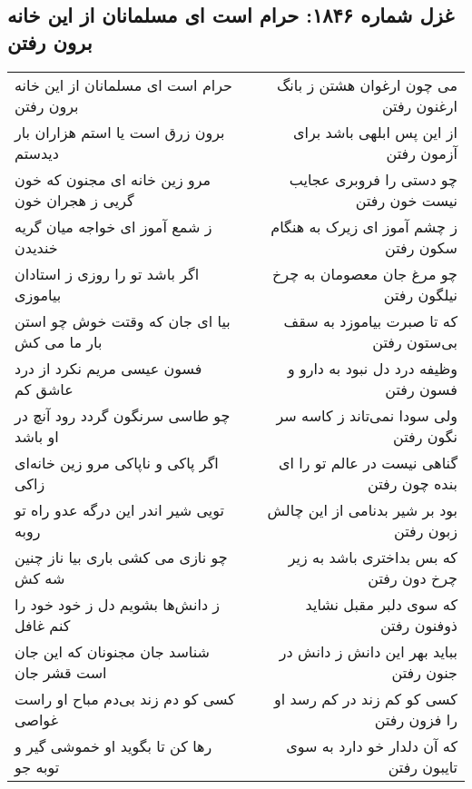 \begin{center}
\section*{غزل شماره ۱۸۴۶: حرام است ای مسلمانان از این خانه برون رفتن}
\label{sec:1846}
\begin{longtable}{l p{0.5cm} r}
حرام است ای مسلمانان از این خانه برون رفتن
&&
می چون ارغوان هشتن ز بانگ ارغنون رفتن
\\
برون زرق است یا استم هزاران بار دیدستم
&&
از این پس ابلهی باشد برای آزمون رفتن
\\
مرو زین خانه ای مجنون که خون گریی ز هجران خون
&&
چو دستی را فروبری عجایب نیست خون رفتن
\\
ز شمع آموز ای خواجه میان گریه خندیدن
&&
ز چشم آموز ای زیرک به هنگام سکون رفتن
\\
اگر باشد تو را روزی ز استادان بیاموزی
&&
چو مرغ جان معصومان به چرخ نیلگون رفتن
\\
بیا ای جان که وقتت خوش چو استن بار ما می کش
&&
که تا صبرت بیاموزد به سقف بی‌ستون رفتن
\\
فسون عیسی مریم نکرد از درد عاشق کم
&&
وظیفه درد دل نبود به دارو و فسون رفتن
\\
چو طاسی سرنگون گردد رود آنچ در او باشد
&&
ولی سودا نمی‌تاند ز کاسه سر نگون رفتن
\\
اگر پاکی و ناپاکی مرو زین خانه‌ای زاکی
&&
گناهی نیست در عالم تو را ای بنده چون رفتن
\\
تویی شیر اندر این درگه عدو راه تو روبه
&&
بود بر شیر بدنامی از این چالش زبون رفتن
\\
چو نازی می کشی باری بیا ناز چنین شه کش
&&
که بس بداختری باشد به زیر چرخ دون رفتن
\\
ز دانش‌ها بشویم دل ز خود خود را کنم غافل
&&
که سوی دلبر مقبل نشاید ذوفنون رفتن
\\
شناسد جان مجنونان که این جان است قشر جان
&&
بباید بهر این دانش ز دانش در جنون رفتن
\\
کسی کو دم زند بی‌دم مباح او راست غواصی
&&
کسی کو کم زند در کم رسد او را فزون رفتن
\\
رها کن تا بگوید او خموشی گیر و توبه جو
&&
که آن دلدار خو دارد به سوی تایبون رفتن
\\
\end{longtable}
\end{center}
